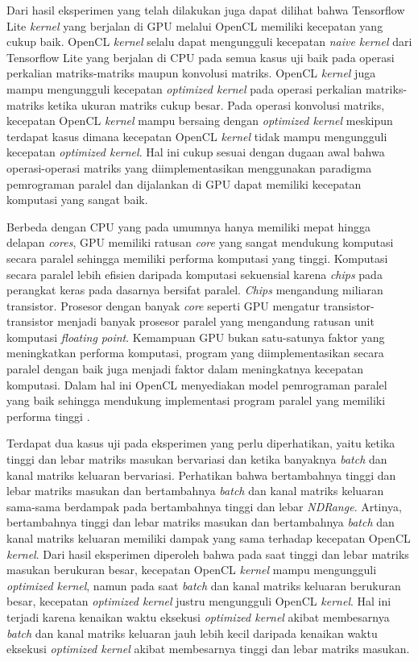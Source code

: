 Dari hasil eksperimen yang telah dilakukan juga dapat dilihat bahwa Tensorflow Lite \textit{kernel} yang berjalan di GPU melalui OpenCL memiliki kecepatan yang cukup baik. OpenCL \textit{kernel} selalu dapat mengungguli kecepatan \textit{naive kernel} dari Tensorflow Lite yang berjalan di CPU pada semua kasus uji baik pada operasi perkalian matriks-matriks maupun konvolusi matriks. OpenCL \textit{kernel} juga mampu mengungguli kecepatan \textit{optimized kernel} pada operasi perkalian matriks-matriks ketika ukuran matriks cukup besar. Pada operasi konvolusi matriks, kecepatan OpenCL \textit{kernel} mampu bersaing dengan \textit{optimized kernel} meskipun terdapat kasus dimana kecepatan OpenCL \textit{kernel} tidak mampu mengungguli kecepatan \textit{optimized kernel}. Hal ini cukup sesuai dengan dugaan awal bahwa operasi-operasi matriks yang diimplementasikan menggunakan paradigma pemrograman paralel dan dijalankan di GPU dapat memiliki kecepatan komputasi yang sangat baik. 

Berbeda dengan CPU yang pada umumnya hanya memiliki mepat hingga delapan \textit{cores}, GPU memiliki ratusan \textit{core} yang sangat mendukung komputasi secara paralel sehingga memiliki performa komputasi yang tinggi. Komputasi secara paralel lebih efisien daripada komputasi sekuensial karena \textit{chips} pada perangkat keras pada dasarnya bersifat paralel. \textit{Chips} mengandung miliaran transistor. Prosesor dengan banyak \textit{core} seperti GPU mengatur transistor-transistor menjadi banyak prosesor paralel yang mengandung ratusan unit komputasi \textit{floating point}. Kemampuan GPU bukan satu-satunya faktor yang meningkatkan performa komputasi, program yang diimplementasikan secara paralel dengan baik juga menjadi faktor dalam meningkatnya kecepatan komputasi. Dalam hal ini OpenCL menyediakan model pemrograman paralel yang baik sehingga mendukung implementasi program paralel yang memiliki performa tinggi \cite{openclguide}. 

Terdapat dua kasus uji pada eksperimen yang perlu diperhatikan, yaitu ketika tinggi dan lebar matriks masukan bervariasi dan ketika banyaknya \textit{batch} dan kanal matriks keluaran bervariasi. Perhatikan bahwa bertambahnya tinggi dan lebar matriks masukan dan bertambahnya \textit{batch} dan kanal matriks keluaran sama-sama berdampak pada bertambahnya tinggi dan lebar \textit{NDRange}. Artinya, bertambahnya tinggi dan lebar matriks masukan dan bertambahnya \textit{batch} dan kanal matriks keluaran memiliki dampak yang sama terhadap kecepatan OpenCL \textit{kernel}. Dari hasil eksperimen diperoleh bahwa pada saat tinggi dan lebar matriks masukan berukuran besar, kecepatan OpenCL \textit{kernel} mampu mengungguli \textit{optimized kernel}, namun pada saat \textit{batch} dan kanal matriks keluaran berukuran besar, kecepatan \textit{optimized kernel} justru mengungguli OpenCL \textit{kernel}. Hal ini terjadi karena kenaikan waktu eksekusi \textit{optimized kernel} akibat membesarnya \textit{batch} dan kanal matriks keluaran jauh lebih kecil daripada kenaikan waktu eksekusi \textit{optimized kernel} akibat membesarnya tinggi dan lebar matriks masukan.


